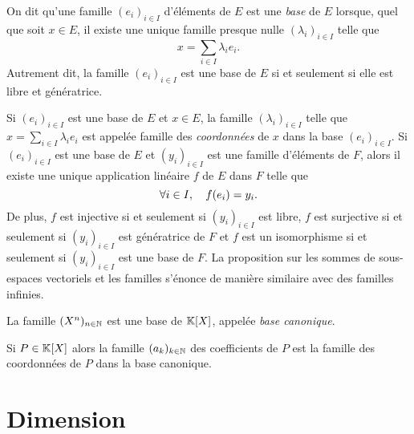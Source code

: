 \documentclass{magnolia}
\begin{document}
\begin{definition}[utile=-3]
On dit qu'une famille $(e_i)_{i\in I}$ d'éléments de $E$ est une \emph{base} de $E$ lorsque, quel que soit $x\in E$, il existe une
unique famille presque nulle $(\lambda_i)_{i\in I}$ telle que
\[x=\sum_{i\in I} \lambda_i e_i.\]
Autrement dit, la famille $(e_i)_{i\in I}$ est une base de $E$ si et seulement si elle est libre et génératrice.
\end{definition}

\begin{remarques}
\remarque Si $(e_i)_{i\in I}$ est une base de $E$ et $x\in E$, la
  famille $(\lambda_i)_{i\in I}$ telle que
  $x=\sum_{i\in I} \lambda_i e_i$ est appelée famille des
  \emph{coordonnées} de $x$ dans la base $(e_i)_{i\in I}$.
\remarque Si $(e_i)_{i\in I}$ est une base de $E$ et $(y_i)_{i\in I}$ est une famille
d'éléments de $F$, alors il existe une unique application linéaire $f$ de $E$ dans $F$ telle que
\[\forall i\in I,\quad f(e_i)=y_i.\]
De plus, $f$ est injective si et seulement si $(y_i)_{i\in I}$ est libre, $f$ est surjective si et seulement si
$(y_i)_{i\in I}$ est génératrice de $F$ et $f$ est un isomorphisme si et seulement si $(y_i)_{i\in I}$ est une base de $F$.
\remarque La proposition sur les sommes de sous-espaces vectoriels
  et les familles s'énonce de manière similaire avec des familles
  infinies.
\end{remarques}


\begin{definition}
La famille $(X^n)_{n\in\mathbb{N}}$ est une base de $\polyK$, appelée \emph{base canonique}.
\end{definition}

\begin{remarqueUnique}
\remarque Si $P\in\polyK$ alors la famille 
  $(a_k)_{k\in\mathbb{N}}$ des coefficients de $P$ est la famille des coordonnées de  $P$ dans
  la base canonique.
\end{remarqueUnique}

\section{Dimension}
\end{document}
